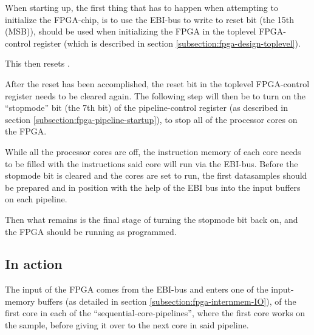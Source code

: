 When starting up, the first thing that has to happen when attempting to
initialize the FPGA-chip, is to use the EBI-bus to write to reset bit (the 15th
(MSB)), should be used when initializing the FPGA in the toplevel
FPGA-control register (which is described in section
\ref{subsection:fpga-design-toplevel}).

This then resets .

After the reset has been accomplished, the reset bit in the toplevel
FPGA-control register needs to be cleared again. The following step will then be
to turn on the ``stopmode'' bit (the 7th bit) of the pipeline-control
register (as described in section \ref{subsection:fpga-pipeline-startup}),
to stop all of the processor cores on the FPGA.

While all the processor cores are off, the instruction memory of each core needs
to be filled with the instructions said core will run via the EBI-bus. Before
the stopmode bit is cleared and the cores are set to run, the first datasamples
should be prepared and in position with the help of the EBI bus into the input
buffers on each pipeline.

Then what remains is the final stage of turning the stopmode bit back on, and
the FPGA should be running as programmed.

\subsection{In action}

The input of the FPGA comes from the EBI-bus and enters one of the input-memory
buffers (as detailed in section \ref{subsection:fpga-internmem-IO}), of the
first core in each of the ``sequential-core-pipelines'', where the first core
works on the sample, before giving it over to the next core in said pipeline.
